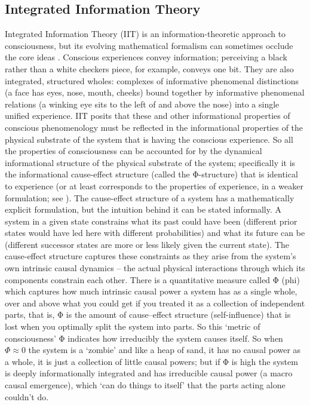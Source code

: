 \documentclass[11pt, a4paper, onecolumn, gdm]{google}
\begin{document}
\subsection{Integrated Information Theory}\label{integrated-information-theory}

Integrated Information Theory (IIT) is an information-theoretic approach to consciousness, but its evolving mathematical formalism can sometimes occlude the core ideas \citep{tononi2016,albantakis2023}.
Conscious experiences convey information; perceiving a black rather than a white checkers piece, for example, conveys one bit.
They are also integrated, structured wholes: complexes of informative phenomenal distinctions (a face has eyes, nose, mouth, cheeks) bound together by informative phenomenal relations (a winking eye sits to the left of and above the nose) into a single unified experience.
IIT posits that these and other informational properties of conscious phenomenology must be reflected in the informational properties of the physical substrate of the system that is having the conscious experience.
So all the properties of consciousness can be accounted for by the dynamical informational structure of the physical substrate of the system; specifically it is the informational cause-effect structure (called the Φ-structure) that is identical to experience (or at least corresponds to the properties of experience, in a weaker formulation; see \citealp{mediano2022}).
The cause-effect structure of a system has a mathematically explicit formulation, but the intuition behind it can be stated informally.
A system in a given state constrains what its past could have been (different prior states would have led here with different probabilities) and what its future can be (different successor states are more or less likely given the current state).
The cause-effect structure captures these constraints as they arise from the system's own intrinsic causal dynamics -- the actual physical interactions through which its components constrain each other.
There is a quantitative measure called Φ (phi) which captures how much intrinsic causal power a system has as a single whole, over and above what you could get if you treated it as a collection of independent parts, that is, Φ is the amount of cause--effect structure (self-influence) that is lost when you optimally split the system into parts.
So this `metric of consciousness' Φ indicates how irreducibly the system causes itself.
So when \(\Phi \approx 0\) the system is a `zombie' and like a heap of sand, it has no causal power as a whole, it is just a collection of little causal powers; but if Φ is high the system is deeply informationally integrated and has irreducible causal power (a macro causal emergence), which `can do things to itself' that the parts acting alone couldn't do.
\end{document}

